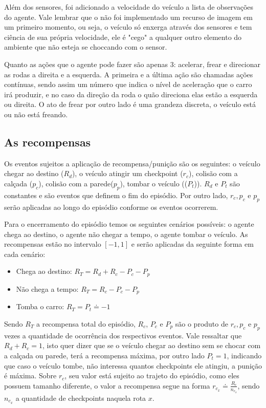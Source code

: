  Além dos sensores, foi adicionado a velocidade do veículo a lista de observações do agente. Vale lembrar que o não foi implementado um recurso de imagem em um primeiro momento, ou seja, o veículo só enxerga através dos sensores e tem ciência de sua própria velocidade, ele é "cego" a qualquer outro elemento do ambiente que não esteja se choccando com o sensor.

 Quanto as ações que o agente pode fazer são apenas 3: acelerar, frear e direcionar as rodas a direita e a esquerda. A primeira e a última ação são chamadas ações contínuas, sendo assim um número que indica o nível de aceleração que o carro irá produzir, e no caso da direção da roda o quão direciona elas estão a esquerda ou direita. O ato de frear por outro lado é uma grandeza discreta, o veículo está ou não está freando.

\subsection{As recompensas}
Os eventos sujeitos a aplicação de recompensa/punição são os seguintes: o veículo chegar ao destino ($R_d$), o veículo atingir um checkpoint ($r_c$), colisão com a calçada ($p_c$), colisão com a parede($p_p$), tombar o veículo (($P_t$)). $R_d$ e $P_t$ são constantes e são eventos que definem o fim do episódio. Por outro lado, $r_c, p_c \text{ e } p_p$ serão aplicadas ao longo do episódio conforme os eventos ocorrerem.

Para o encerramento do episódio temos os seguintes cenários possíveis: o agente chega ao destino, o agente não chegar a tempo, o agente tombar o veículo. As recompensas estão no intervalo $[-1,1]$ e serão aplicadas da seguinte forma em cada cenário:

\begin{itemize}
   \item Chega ao destino: $R_T = R_d + R_c - P_c - P_p$
   \item Não chega a tempo: $R_T = R_c - P_c - P_p$
   \item Tomba o carro: $R_T = P_t \doteq -1$
\end{itemize}

Sendo $R_T$ a recompensa total do episódio, $R_c$, $P_c$ e $P_p$ são o produto de $r_c, p_c \text{ e } p_p$ vezes a quantidade de ocorrência dos respectivos eventos. Vale ressaltar que $R_d + R_c = 1$, isto quer dizer que se o veículo chegar ao destino sem se chocar com a calçada ou parede, terá a recompensa máxima, por outro lado $P_t = 1$, indicando que caso o veículo tombe, não interessa quantos checkpoints ele atingiu, a punição é máxima. Sobre $r_c$, seu valor está sujeito ao trajeto do episódio, como eles possuem tamanho diferente, o valor a recompensa segue na forma $r_{c_x} \doteq \frac{R_c}{n_{c_x}}$, sendo $n_{c_x}$ a quantidade de checkpoints naquela rota $x$.

